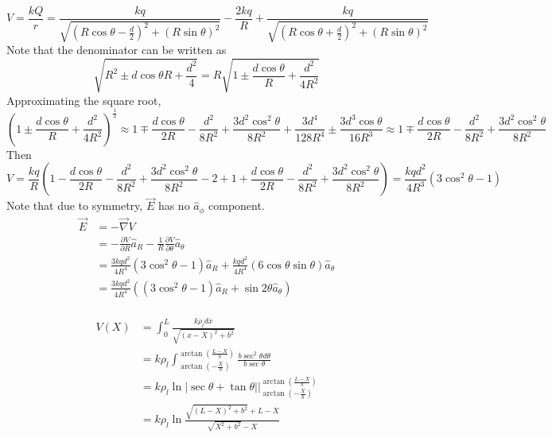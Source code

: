 \documentclass[answers]{exam}
\begin{document}
\begin{questions}
\begin{solution}
	$$V = \frac{kQ}{r} = \frac{kq}{\sqrt{(R\cos\theta-\frac{d}{2})^2 + (R\sin\theta)^2}} - \frac{2kq}{R} + \frac{kq}{\sqrt{(R\cos\theta+\frac{d}{2})^2 + (R\sin\theta)^2}}$$
	Note that the denominator can be written as
	$$\sqrt{R^2\pm d\cos\theta R + \frac{d^2}{4}} = R\sqrt{1\pm \frac{d\cos\theta}{R} + \frac{d^2}{4R^2}}$$
	Approximating the square root,
	$$\left(1\pm\frac{d\cos\theta}{R}+\frac{d^2}{4R^2}\right)^{\frac{1}{2}} \approx 1 \mp \frac{d\cos\theta}{2R} - \frac{d^2}{8R^2} + \frac{3d^2\cos^2\theta}{8R^2} + \frac{3d^4}{128R^4} \pm \frac{3d^3\cos\theta}{16R^3} \approx 1 \mp \frac{d\cos\theta}{2R} - \frac{d^2}{8R^2} + \frac{3d^2\cos^2\theta}{8R^2}$$
	Then
$$V = \frac{kq}{R}\left(1 - \frac{d\cos\theta}{2R} - \frac{d^2}{8R^2} + \frac{3d^2\cos^2\theta}{8R^2} - 2 + 1 + \frac{d\cos\theta}{2R} - \frac{d^2}{8R^2} + \frac{3d^2\cos^2\theta}{8R^2}\right) = \frac{kqd^2}{4R^3}\left(3\cos^2\theta - 1\right)$$
	Note that due to symmetry, $\vec{E}$ has no $\hat{a}_\phi$ component.
	\begin{align*}
		\vec{E} &= -\vec{\nabla}V \\
			&= -\frac{\partial V}{\partial R}\hat{a}_R - \frac{1}{R}\frac{\partial V}{\partial \theta}\hat{a}_\theta \\
			&= \frac{3kqd^2}{4R^4}(3\cos^2\theta - 1)\hat{a}_R + \frac{kqd^2}{4R^4}(6\cos\theta\sin\theta)\hat{a}_\theta \\
			&= \frac{3kqd^2}{4R^4}((3\cos^2\theta - 1)\hat{a}_R + \sin2\theta\hat{a}_\theta) \\
	\end{align*}
\end{solution}


\begin{solution}
	\begin{align*}
		V(X) &= \int_0^L \frac{k\rho_l dx}{\sqrt{(x-X)^2+b^2}} \\
		     &= k\rho_l \int_{\arctan\left(-\frac{X}{b}\right)}^{\arctan\left(\frac{L-X}{b}\right)} \frac{b\sec^2\theta d\theta}{b\sec \theta} \\
		     &= k\rho_l\ln|\sec\theta + \tan\theta| \Big |_{\arctan\left(-\frac{X}{b}\right)}^{\arctan\left(\frac{L-X}{b}\right)} \\
		     &= k\rho_l \ln\frac{\sqrt{(L-X)^2+b^2} + L - X}{\sqrt{X^2 + b^2} - X}
	\end{align*}
\end{solution}


\end{questions}
\end{document}
